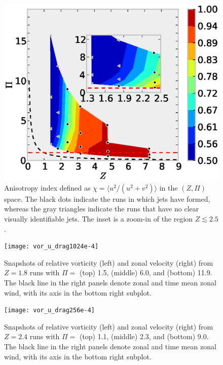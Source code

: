 \documentclass{ametsoc}
\begin{document}
\begin{figure}
\begin{center}
\includegraphics[width=6in]{anisotropic_index}\caption{Anisotropy index defined as $\chi=\langle u^{2}/(u^{2}+v^{2})\rangle$
in the $(Z,\Pi)$ space. The black dots indicate the runs in which
jets have formed, whereas the gray triangles indicate the runs that have
no clear visually identifiable jets. The inset is a zoom-in of the
region $Z\apprle2.5$.}
\label{anisotropic_index}
\end{center}
\end{figure}


\begin{figure}
\begin{center}
\texttt{[image: vor\_u\_drag1024e-4]}\caption{Snapshots of relative vorticity (left) and zonal velocity (right)
from $Z=1.8$ runs with $\Pi=$ (top) 1.5, (middle) 6.0, and (bottom)
11.9. The black line in the right panels denote zonal and time mean
zonal wind, with its axis in the bottom right subplot.}
\label{vor_u_snapshot_drag1024e-4}
\end{center}
\end{figure}


\begin{figure}
\begin{center}
\texttt{[image: vor\_u\_drag256e-4]}\caption{Snapshots of relative vorticity (left) and zonal velocity (right)
from $Z=2.4$ runs with $\Pi=$ (top) 1.1, (middle) 2.3, and (bottom)
9.0. The black line in the right panels denote zonal and time mean
zonal wind, with its axis in the bottom right subplot.}
\label{vor_u_snapshot_drag256e-4}
\end{center}
\end{figure}
\end{document}
